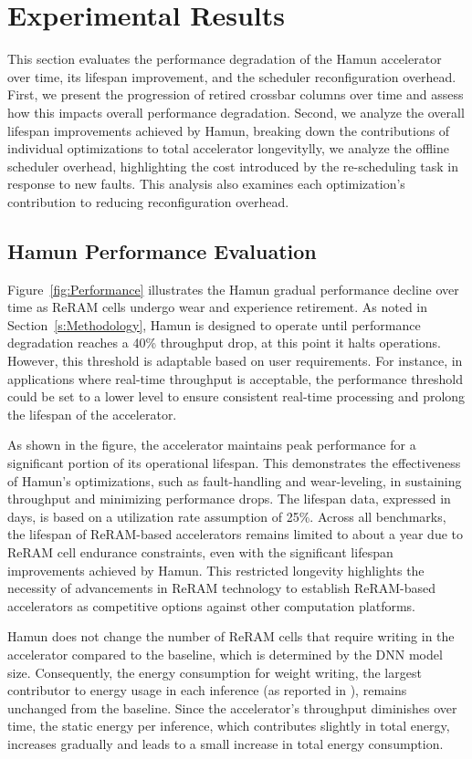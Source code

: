 \section{Experimental Results}\label{s:Results}
This section evaluates the performance degradation of the Hamun accelerator over time, its lifespan improvement, and the scheduler reconfiguration overhead. First, we present the progression of retired crossbar columns over time and assess how this impacts overall performance degradation. Second, we analyze the overall lifespan improvements achieved by Hamun, breaking down the contributions of individual optimizations to total accelerator longevitylly, we analyze the offline scheduler overhead, highlighting the cost introduced by the re-scheduling task in response to new faults. This analysis also examines each optimization’s contribution to reducing reconfiguration overhead.

\subsection{Hamun Performance Evaluation}\label{subs:trend}
Figure~\ref{fig:Performance} illustrates the Hamun gradual performance decline over time as ReRAM cells undergo wear and experience retirement. As noted in Section~\ref{s:Methodology}, Hamun is designed to operate until performance degradation reaches a 40\% throughput drop, at this point it halts operations. However, this threshold is adaptable based on user requirements. For instance, in applications where real-time throughput is acceptable, the performance threshold could be set to a lower level to ensure consistent real-time processing and prolong the lifespan of the accelerator.

As shown in the figure, the accelerator maintains peak performance for a significant portion of its operational lifespan. This demonstrates the effectiveness of Hamun's optimizations, such as fault-handling and wear-leveling, in sustaining throughput and minimizing performance drops. The lifespan data, expressed in days, is based on a utilization rate assumption of 25\%. Across all benchmarks, the lifespan of ReRAM-based accelerators remains limited to about a year due to ReRAM cell endurance constraints, even with the significant lifespan improvements achieved by Hamun. This restricted longevity highlights the necessity of advancements in ReRAM technology to establish ReRAM-based accelerators as competitive options against other computation platforms.

Hamun does not change the number of ReRAM cells that require writing in the accelerator compared to the baseline, which is determined by the DNN model size. Consequently, the energy consumption for weight writing, the largest contributor to energy usage in each inference (as reported in \cite{ARAS}), remains unchanged from the baseline. Since the accelerator’s throughput diminishes over time, the static energy per inference, which contributes slightly in total energy, increases gradually and leads to a small increase in total energy consumption.

